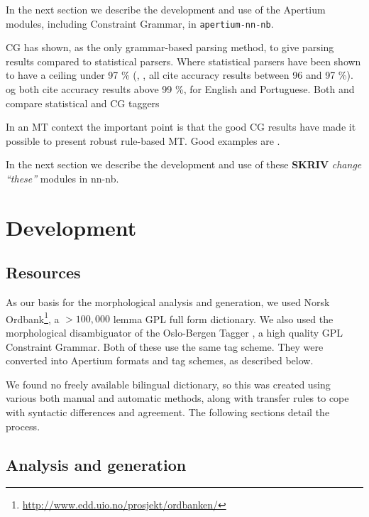 \documentclass[11pt]{article}
\newcommand{\comment}[1]{\textbf{SKRIV} {\it #1}}
\begin{document}
In the next section we describe the development and use of the
Apertium modules, including Constraint Grammar, in {\tt apertium-nn-nb}.

CG has shown, as the only grammar-based parsing method, to give parsing
results compared to statistical parsers. Where statistical parsers have been 
shown to have a ceiling under 97 \% (\citep{leech1994claws}, \citep{brants1998}, 
\citep{brill1997web} all cite accuracy results between 96 and 97 \%). 
\citep{voutilainen1992engcg} og \citet{bick2000palavras} both cite accuracy 
results above 99 \%, for English and Portuguese. Both \citep{chanod1997} 
and \citep{samuelsson1997cg} compare statistical and CG taggers 

In an MT context the important point is that the good CG results have 
made it possible to present robust rule-based MT. Good examples are
\citet{Bick200xfyn}. %

In the next section we describe the development and use of these 
\comment{change ``these''}
modules in nn-nb.


\section{Development}

  \label{sec:development}
\subsection{Resources}

As our basis for the morphological analysis and generation, we used
Norsk
Ordbank\footnote{\href{http://www.edd.uio.no/prosjekt/ordbanken/}{http://www.edd.uio.no/prosjekt/ordbanken/}
}, a $>100,000$ lemma GPL full form dictionary. We also used the
morphological disambiguator of the Oslo-Bergen Tagger
\citep{hagen2000cbt}, a high quality GPL Constraint Grammar. Both of
these use the same tag scheme. They were converted into Apertium
formats and tag schemes, as described below.

We found no freely available bilingual dictionary, so this was created
using various both manual and automatic methods, along with transfer
rules to cope with syntactic differences and agreement. The following
sections detail the process.

\subsection{Analysis and generation}
\end{document}
